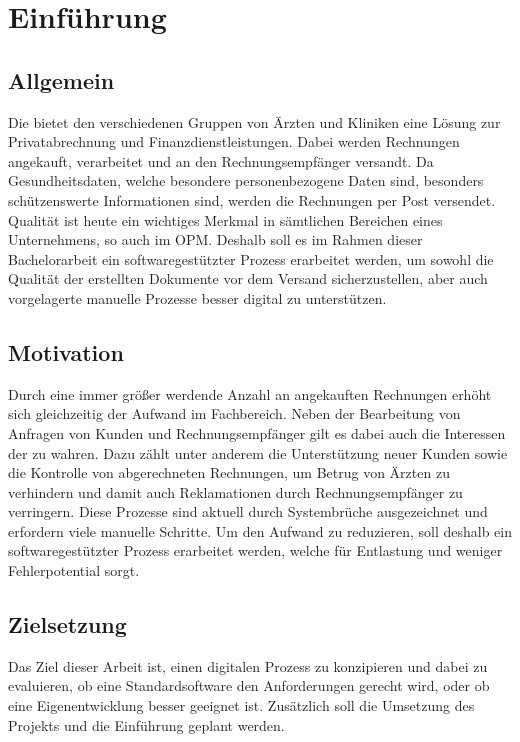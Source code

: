 \section{Einführung}
\subsection{Allgemein}
Die \mediserv{} bietet den verschiedenen Gruppen von Ärzten und Kliniken eine Lösung zur Privatabrechnung und Finanzdienstleistungen.
Dabei werden Rechnungen angekauft, verarbeitet und an den Rechnungsempfänger versandt.
Da Gesundheitsdaten, welche besondere personenbezogene Daten sind,
besonders schützenswerte Informationen sind, werden die Rechnungen per Post versendet. 
Qualität ist heute ein wichtiges Merkmal in sämtlichen Bereichen eines Unternehmens, so auch im \acrfull{OPM}.
Deshalb soll es im Rahmen dieser Bachelorarbeit ein softwaregestützter Prozess erarbeitet werden,
um sowohl die Qualität der erstellten Dokumente vor dem Versand sicherzustellen,
aber auch vorgelagerte manuelle Prozesse besser digital zu unterstützen.


\subsection{Motivation}
Durch eine immer größer werdende Anzahl an angekauften Rechnungen erhöht sich gleichzeitig der Aufwand im Fachbereich.
Neben der Bearbeitung von Anfragen von Kunden und Rechnungsempfänger gilt es dabei auch die Interessen der \mediserv{} zu wahren.
Dazu zählt unter anderem die Unterstützung neuer Kunden
sowie die Kontrolle von abgerechneten Rechnungen, um Betrug von Ärzten zu verhindern und damit auch Reklamationen durch Rechnungsempfänger zu verringern.
Diese Prozesse sind aktuell durch Systembrüche ausgezeichnet und erfordern viele manuelle Schritte.
Um den Aufwand zu reduzieren, soll deshalb ein softwaregestützter Prozess erarbeitet werden, welche für Entlastung und weniger Fehlerpotential sorgt.

\subsection{Zielsetzung}
Das Ziel dieser Arbeit ist, einen digitalen Prozess zu konzipieren und dabei zu evaluieren,
ob eine Standardsoftware den Anforderungen gerecht wird, oder ob eine Eigenentwicklung besser geeignet ist.
Zusätzlich soll die Umsetzung des Projekts und die Einführung geplant werden.
